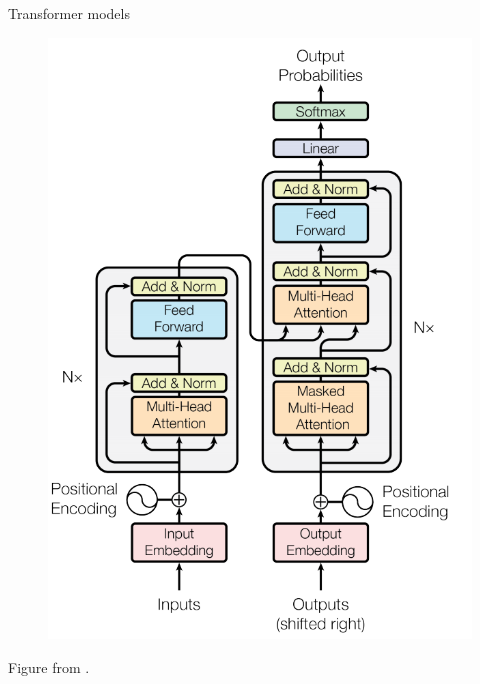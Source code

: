 \begin{frame}{Transformer models}
\begin{minipage}{0.38\textwidth}
\begin{figure}
\begin{center}
     \includegraphics[width=0.9\linewidth]{figures/trafo_original.png}
   \end{center}
\end{figure}
\scriptsize{Figure from \cite{trafo}.}
 \end{minipage}
\end{frame}

